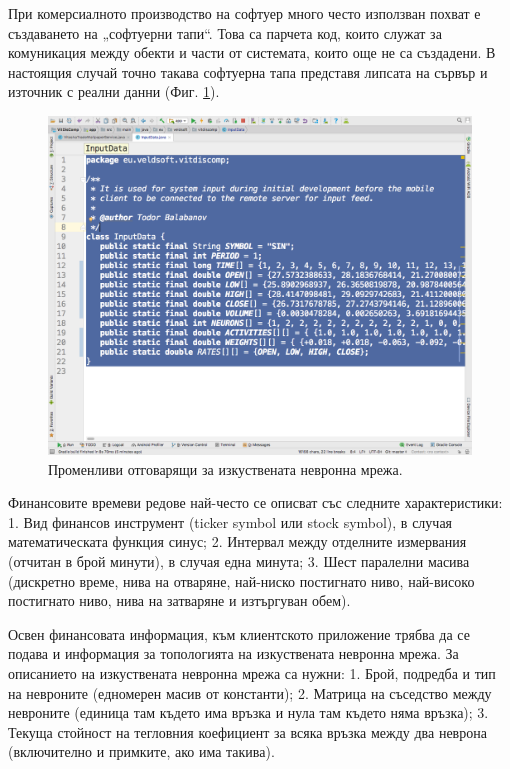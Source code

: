 \documentclass[book,14pt,oneside,openany]{memoir}
\begin{document}
При комерсиалното производство на софтуер много често използван похват е създаването на „софтуерни тапи“. Това са парчета код, които служат за комуникация между обекти и части от системата, които още не са създадени. В настоящия случай точно такава софтуерна тапа представя липсата на сървър и източник с реални данни  (Фиг. \ref{fig:pic0035}).  

\begin{figure}[h]
  \centering
  \includegraphics[height=0.45\pdfpageheight]{pic0035}
  \caption{Променливи отговарящи за изкуствената невронна мрежа.}
\label{fig:pic0035}
\end{figure}
\FloatBarrier

Финансовите времеви редове най-често се описват със следните характеристики: 1. Вид финансов инструмент (ticker symbol или stock symbol), в случая математическата функция синус; 2. Интервал между отделните измервания (отчитан в брой минути), в случая една минута; 3. Шест паралелни масива (дискретно време, нива на отваряне, най-ниско постигнато ниво, най-високо постигнато ниво, нива на затваряне и изтъргуван обем).

Освен финансовата информация, към клиентското приложение трябва да се подава и информация за топологията на изкуствената невронна мрежа. За описанието на изкуствената невронна мрежа са нужни: 1. Брой, подредба и тип на невроните (едномерен масив от константи); 2. Матрица на съседство между невроните (единица там където има връзка и нула там където няма връзка); 3. Текуща стойност на тегловния коефициент за всяка връзка между два неврона (включително и примките, ако има такива). 
\end{document}
